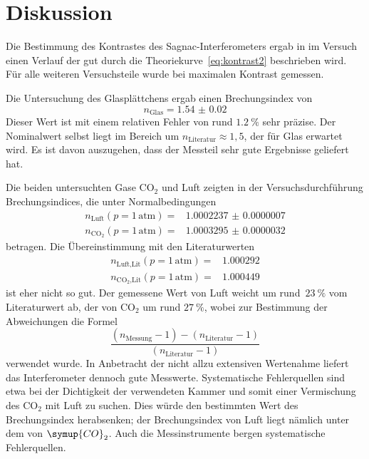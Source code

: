 \section{Diskussion}
\label{sec:diskussion}

Die Bestimmung des Kontrastes des Sagnac-Interferometers ergab in
im Versuch einen Verlauf der gut durch die Theoriekurve~\eqref{eq:kontrast2}
beschrieben wird. Für alle weiteren Versuchsteile wurde bei maximalen Kontrast
gemessen.

Die Untersuchung des Glasplättchens ergab einen Brechungsindex von
\begin{equation}
  n_{\text{Glas}}=\num{1.54(2)}
\end{equation}
Dieser Wert ist mit einem relativen Fehler von rund $\SI{1.2}{\percent}$ sehr
präzise. Der Nominalwert selbst liegt im Bereich um
$n_\text{Literatur}\approx 1,5$, der für Glas erwartet wird. Es ist davon
auszugehen, dass der Messteil sehr gute Ergebnisse geliefert hat.

Die beiden untersuchten Gase $\text{CO}_2$ und Luft zeigten in der
Versuchsdurchführung Brechungsindices, die unter Normalbedingungen
\begin{align}
  n_{\text{Luft}}(p=1\,\text{atm})=&\num{1.0002237(7)} \\
  n_{\text{CO}_2}(p=1\,\text{atm})=&\num{1.0003295(32)}
\end{align}
betragen. Die Übereinstimmung mit den Literaturwerten~\cite{brechungsindices}
\begin{align}
  n_{\text{Luft}\text{,Lit}}(p=1\,\text{atm})=&\num{1.000292} \\
  n_{\text{CO}_2\text{,Lit}}(p=1\,\text{atm})=&\num{1.000449}
\end{align}
ist eher nicht so gut. Der gemessene Wert von Luft weicht um
rund~$\SI{23}{\percent}$ vom Literaturwert ab, der von $\text{CO}_2$ um rund
$\SI{27}{\percent}$, wobei zur Bestimmung der Abweichungen die Formel
\begin{equation}
  \frac{(n_{\text{Messung}}-1)-(n_{\text{Literatur}}-1)}
  {(n_{\text{Literatur}}-1)}
\end{equation}
verwendet wurde. In Anbetracht der nicht allzu extensiven Wertenahme liefert das
Interferometer dennoch gute Messwerte. Systematische Fehlerquellen sind etwa bei
der Dichtigkeit der verwendeten Kammer und somit einer Vermischung des
$\text{CO}_2$ mit Luft zu suchen. Dies würde den bestimmten Wert des
Brechungsindex herabsenken; der Brechungsindex von Luft liegt nämlich unter dem
von $\symup{CO}_2$. Auch die Messinstrumente bergen systematische Fehlerquellen.
